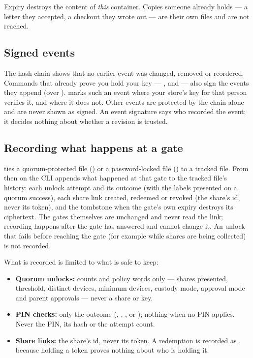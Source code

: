 \begin{cautionBox}
Expiry destroys the content of \emph{this} container. Copies someone
already holds --- a letter they accepted, a checkout they wrote out --- are
their own files and are not reached.
\end{cautionBox}

\subsection{Signed events}

The hash chain shows that no earlier event was changed, removed or
reordered. Commands that already prove you hold your key --- ,  and  --- also sign
the events they append (over ).  marks such an event
\code{[signed by ...]} where your store's key for that person verifies it,
and  where it does not. Other
events are protected by the chain alone and are never shown as signed. An
event signature says who recorded the event; it decides nothing about
whether a revision is trusted.

\subsection{Recording what happens at a gate}

 ties a quorum-protected file () or a
password-locked file () to a tracked file. From then on
the CLI appends what happened at that gate to the tracked file's history:
each unlock attempt and its outcome (with the labels presented on a quorum
success), each share link created, redeemed or revoked (the share's id,
never its token), and the tombstone when the gate's own expiry destroys its
ciphertext. The gates themselves are unchanged and never read the link;
recording happens after the gate has answered and cannot change it. An
unlock that fails before reaching the gate (for example while shares are
being collected) is not recorded.

What is recorded is limited to what is safe to keep:

\begin{itemize}
  \item \textbf{Quorum unlocks:} counts and policy words only --- shares
  presented, threshold, distinct devices, minimum devices, custody mode,
  approval mode and parent approvals --- never a share or key.
  \item \textbf{PIN checks:} only the outcome (,
  , ,  or ); nothing
  when no PIN applies. Never the PIN, its hash or the attempt count.
  \item \textbf{Share links:} the share's id, never its token. A redemption
  is recorded as , because holding a token
  proves nothing about who is holding it.
\end{itemize}

